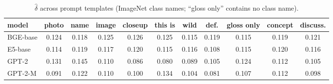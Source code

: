 \begin{table}[H]
\centering
\scriptsize
\begin{tabular}{lcccccccccc}
\toprule
model & photo & name & image & closeup & this is & wild & def. & gloss only & concept & discuss. \\
\midrule
BGE-base & 0.124 & 0.118 & 0.125 & 0.126 & 0.125 & 0.115 & 0.119 & 0.115 & 0.119 & 0.121 \\
E5-base & 0.114 & 0.119 & 0.117 & 0.120 & 0.115 & 0.116 & 0.108 & 0.115 & 0.120 & 0.116 \\
GPT-2 & 0.131 & 0.145 & 0.110 & 0.086 & 0.080 & 0.089 & 0.105 & 0.124 & 0.112 & 0.105 \\
GPT-2-M & 0.091 & 0.122 & 0.110 & 0.100 & 0.134 & 0.104 & 0.081 & 0.107 & 0.112 & 0.098 \\
\bottomrule
\end{tabular}
\caption{$\hat\delta$ across prompt templates (ImageNet class names; ``gloss only'' contains no class name).}
\label{tab:a7}
\end{table}
